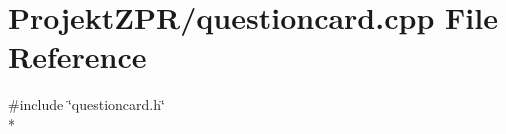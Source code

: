 \section{Projekt\-Z\-P\-R/questioncard.cpp File Reference}
\label{questioncard_8cpp}
{\ttfamily \#include \char`\"{}questioncard.\-h\char`\"{}}\\*
